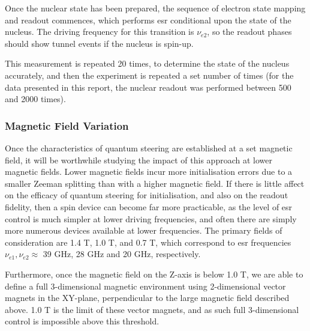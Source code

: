 		Once the nuclear state has been prepared, the sequence of electron state mapping and readout commences, which performs \gls{esr} conditional upon the state of the nucleus. The driving frequency for this transition is $\nu_{e2}$, so the readout phases should show tunnel events if the nucleus is spin-up.
	
		This measurement is repeated 20 times, to determine the state of the nucleus accurately, and then the experiment is repeated a set number of times (for the data presented in this report, the nuclear readout was performed between 500 and 2000 times). 
		
	\subsubsection{Magnetic Field Variation}
		Once the characteristics of quantum steering are established at a set magnetic field, it will be worthwhile studying the impact of this approach at lower magnetic fields. Lower magnetic fields incur more initialisation errors due to a smaller Zeeman splitting than with a higher magnetic field. If there is little affect on the efficacy of quantum steering for initialisation, and also on the readout fidelity, then a spin device can become far more practicable, as the level of \gls{esr} control is much simpler at lower driving frequencies, and often there are simply more numerous devices available at lower frequencies. The primary fields of consideration are 1.4 T, 1.0 T, and 0.7 T, which correspond to \gls{esr} frequencies  $\nu_{e1}, \nu_{e2} \approx$ 39 GHz, 28 GHz and 20 GHz, respectively.
		
		Furthermore, once the magnetic field on the Z-axis is below 1.0 T, we are able to define a full 3-dimensional magnetic environment using 2-dimensional vector magnets in the XY-plane, perpendicular to the large magnetic field described above. 1.0 T is the limit of these vector magnets, and as such full 3-dimensional control is impossible above this threshold.
		
	